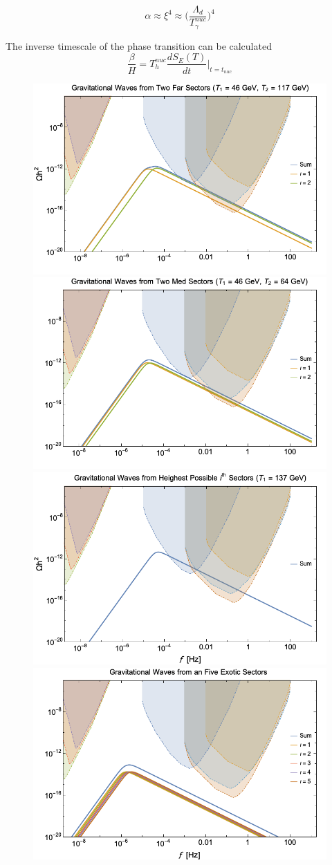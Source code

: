 \documentclass[nofootinbib,twocolumn,preprintnumbers]{revtex4-1}
\begin{document}
\begin{equation}
\alpha \approx \xi^{4} \approx \bigg( \frac{\Lambda_{d}}{T_{\gamma}^{nuc}}\bigg)^4
\end{equation}


The inverse timescale of the phase transition can be calculated
\begin{equation}
\frac{\beta}{H} = T^{nuc}_h \frac{dS_{E}(T)}{dt}\bigg|_{t = t_{nuc}}
\end{equation}


\begin{figure}[tb]
\centering
\begin{minipage}[c]{\textwidth}
\includegraphics[width=.45\textwidth]{TwoFar.png} 
\hfill
\includegraphics[width=.45\textwidth]{TwoMed.png} 
\hfill
\includegraphics[width=.45\textwidth ]{highest.png}
\hfill
\includegraphics[width=.45\textwidth]{energydensity.png} 

\end{minipage}
\end{figure}
\end{document}
